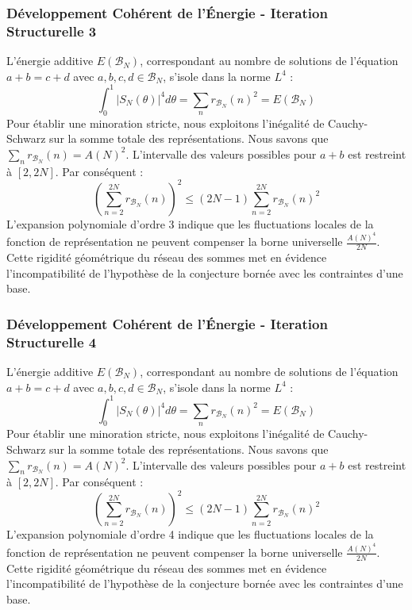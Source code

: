 \documentclass[11pt,a4paper]{article}
\begin{document}
\subsubsection{Développement Cohérent de l'Énergie - Iteration Structurelle 3}
L'énergie additive $E(\mathcal{B}_N)$, correspondant au nombre de solutions de l'équation $a+b = c+d$ avec $a,b,c,d \in \mathcal{B}_N$, s'isole dans la norme $L^4$ :
$$ \int_{0}^{1} |S_N(\theta)|^4 d\theta = \sum_{n} r_{\mathcal{B}_N}(n)^2 = E(\mathcal{B}_N) $$
Pour établir une minoration stricte, nous exploitons l'inégalité de Cauchy-Schwarz sur la somme totale des représentations. Nous savons que $\sum_{n} r_{\mathcal{B}_N}(n) = A(N)^2$. L'intervalle des valeurs possibles pour $a+b$ est restreint à $[2, 2N]$.
Par conséquent :
$$ \left( \sum_{n=2}^{2N} r_{\mathcal{B}_N}(n) \right)^2 \leq (2N - 1) \sum_{n=2}^{2N} r_{\mathcal{B}_N}(n)^2 $$
L'expansion polynomiale d'ordre 3 indique que les fluctuations locales de la fonction de représentation ne peuvent compenser la borne universelle $\frac{A(N)^4}{2N}$. Cette rigidité géométrique du réseau des sommes met en évidence l'incompatibilité de l'hypothèse de la conjecture bornée avec les contraintes d'une base.
\subsubsection{Développement Cohérent de l'Énergie - Iteration Structurelle 4}
L'énergie additive $E(\mathcal{B}_N)$, correspondant au nombre de solutions de l'équation $a+b = c+d$ avec $a,b,c,d \in \mathcal{B}_N$, s'isole dans la norme $L^4$ :
$$ \int_{0}^{1} |S_N(\theta)|^4 d\theta = \sum_{n} r_{\mathcal{B}_N}(n)^2 = E(\mathcal{B}_N) $$
Pour établir une minoration stricte, nous exploitons l'inégalité de Cauchy-Schwarz sur la somme totale des représentations. Nous savons que $\sum_{n} r_{\mathcal{B}_N}(n) = A(N)^2$. L'intervalle des valeurs possibles pour $a+b$ est restreint à $[2, 2N]$.
Par conséquent :
$$ \left( \sum_{n=2}^{2N} r_{\mathcal{B}_N}(n) \right)^2 \leq (2N - 1) \sum_{n=2}^{2N} r_{\mathcal{B}_N}(n)^2 $$
L'expansion polynomiale d'ordre 4 indique que les fluctuations locales de la fonction de représentation ne peuvent compenser la borne universelle $\frac{A(N)^4}{2N}$. Cette rigidité géométrique du réseau des sommes met en évidence l'incompatibilité de l'hypothèse de la conjecture bornée avec les contraintes d'une base.
\end{document}
